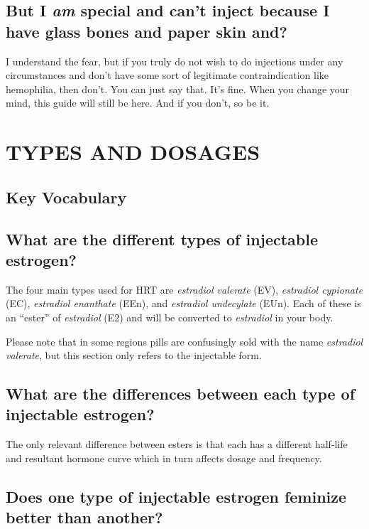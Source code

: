 \documentclass{article}
\begin{document}
\subsection{But I \textit{am} special and can’t inject because I have glass bones and paper skin and\textemdash{}?}

I understand the fear, but if you truly do not wish to do injections under any circumstances and don’t have some sort of legitimate contraindication like hemophilia, then don’t. You can just say that. It’s fine. When you change your mind, this guide will still be here. And if you don’t, so be it.



\section{TYPES AND DOSAGES}\label{td}

\subsection*{Key Vocabulary}

\subsection{What are the different types of injectable estrogen?}

The four main types used for HRT are \textit{estradiol valerate} (EV), \textit{estradiol cypionate} (EC), \textit{estradiol enanthate} (EEn), and \textit{estradiol undecylate} (EUn). Each of these is an “ester” of \textit{estradiol} (E2) and will be converted to \textit{estradiol} in your body.

Please note that in some regions pills are confusingly sold with the name \textit{estradiol valerate}, but this section only refers to the injectable form.

\subsection{What are the differences between each type of injectable estrogen?}

The only relevant difference between esters is that each has a different half-life and resultant hormone curve which in turn affects dosage and frequency.

\subsection{Does one type of injectable estrogen feminize better than another?}
\end{document}
